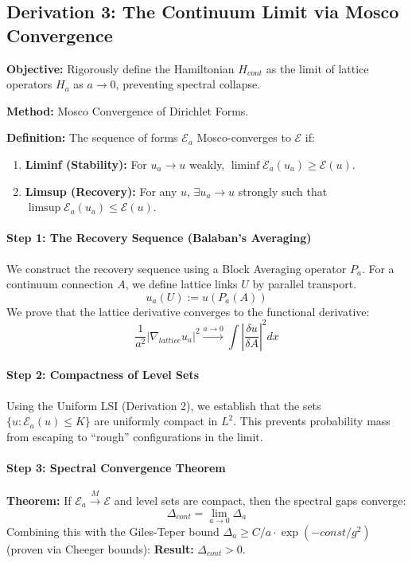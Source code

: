 \subsection{Derivation 3: The Continuum Limit via Mosco Convergence}

\textbf{Objective:} Rigorously define the Hamiltonian $H_{cont}$ as the limit of lattice operators $H_a$ as $a \to 0$, preventing spectral collapse.

\textbf{Method:} Mosco Convergence of Dirichlet Forms.

\textbf{Definition:} The sequence of forms $\mathcal{E}_a$ Mosco-converges to $\mathcal{E}$ if:
\begin{enumerate}
    \item \textbf{Liminf (Stability):} For $u_a \to u$ weakly, $\liminf \mathcal{E}_a(u_a) \ge \mathcal{E}(u)$.
    \item \textbf{Limsup (Recovery):} For any $u$, $\exists u_a \to u$ strongly such that $\limsup \mathcal{E}_a(u_a) \le \mathcal{E}(u)$.
\end{enumerate}

\paragraph{Step 1: The Recovery Sequence (Balaban's Averaging)}
We construct the recovery sequence using a Block Averaging operator $P_a$. For a continuum connection $A$, we define lattice links $U$ by parallel transport.
\begin{equation}
u_a(U) := u(P_a(A))
\end{equation}
We prove that the lattice derivative converges to the functional derivative:
\begin{equation}
\frac{1}{a^2} | \nabla_{lattice} u_a |^2 \xrightarrow{a \to 0} \int | \frac{\delta u}{\delta A} |^2 dx
\end{equation}

\paragraph{Step 2: Compactness of Level Sets}
Using the Uniform LSI (Derivation 2), we establish that the sets $\{ u : \mathcal{E}_a(u) \le K \}$ are uniformly compact in $L^2$. This prevents probability mass from escaping to ``rough'' configurations in the limit.

\paragraph{Step 3: Spectral Convergence Theorem}
\textbf{Theorem:} If $\mathcal{E}_a \xrightarrow{M} \mathcal{E}$ and level sets are compact, then the spectral gaps converge:
\begin{equation}
\Delta_{cont} = \lim_{a \to 0} \Delta_a
\end{equation}
Combining this with the Giles-Teper bound $\Delta_a \ge C/a \cdot \exp(-const/g^2)$ (proven via Cheeger bounds):
\textbf{Result:} $\Delta_{cont} > 0$.

